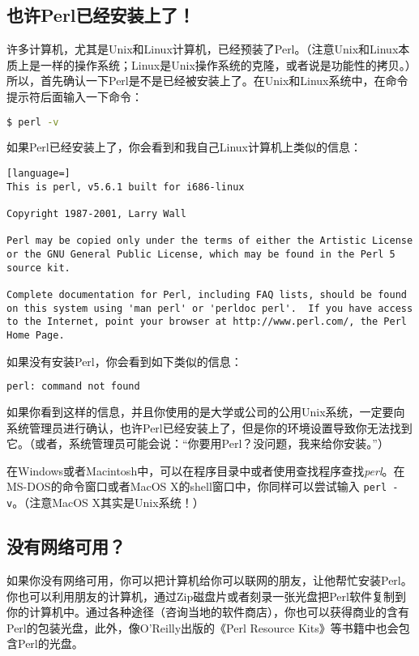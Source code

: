 \subsection{也许Perl已经安装上了！}
许多计算机，尤其是Unix和Linux计算机，已经预装了Perl。（注意Unix和Linux本质上是一样的操作系统；Linux是Unix操作系统的克隆，或者说是功能性的拷贝。）所以，首先确认一下Perl是不是已经被安装上了。在Unix和Linux系统中，在命令提示符后面输入一下命令：

\begin{lstlisting}[language=bash]
$ perl -v
\end{lstlisting}

如果Perl已经安装上了，你会看到和我自己Linux计算机上类似的信息：

\begin{lstlisting}[language=]
This is perl, v5.6.1 built for i686-linux

Copyright 1987-2001, Larry Wall

Perl may be copied only under the terms of either the Artistic License or the GNU General Public License, which may be found in the Perl 5 source kit.

Complete documentation for Perl, including FAQ lists, should be found on this system using 'man perl' or 'perldoc perl'.  If you have access to the Internet, point your browser at http://www.perl.com/, the Perl Home Page.
\end{lstlisting}

如果没有安装Perl，你会看到如下类似的信息：

\begin{lstlisting}[language=sh]
perl: command not found
\end{lstlisting}

如果你看到这样的信息，并且你使用的是大学或公司的公用Unix系统，一定要向系统管理员进行确认，也许Perl已经安装上了，但是你的环境设置导致你无法找到它。（或者，系统管理员可能会说：“你要用Perl？没问题，我来给你安装。”）

在Windows或者Macintosh中，可以在程序目录中或者使用查找程序查找\textit{perl}。在MS-DOS的命令窗口或者MacOS X的shell窗口中，你同样可以尝试输入 \verb|perl -v|。（注意MacOS X其实是Unix系统！）

\subsection{没有网络可用？}
如果你没有网络可用，你可以把计算机给你可以联网的朋友，让他帮忙安装Perl。你也可以利用朋友的计算机，通过Zip磁盘片或者刻录一张光盘把Perl软件复制到你的计算机中。通过各种途径（咨询当地的软件商店），你也可以获得商业的含有Perl的包装光盘，此外，像O'Reilly出版的《Perl Resource Kits》等书籍中也会包含Perl的光盘。

